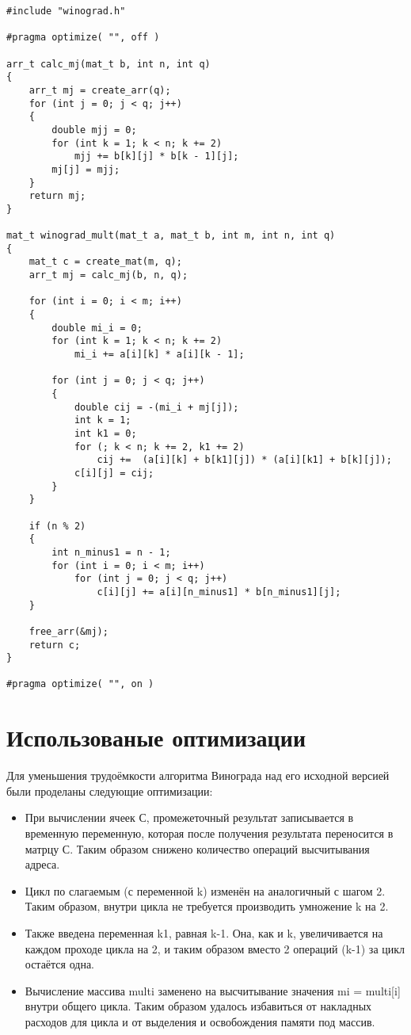 \begin{lstlisting}[caption = Оптимизированая функция умножения матриц алгоритмом Винограда.]
#include "winograd.h"

#pragma optimize( "", off )

arr_t calc_mj(mat_t b, int n, int q)
{
	arr_t mj = create_arr(q);
	for (int j = 0; j < q; j++)
	{
		double mjj = 0; 
		for (int k = 1; k < n; k += 2)
			mjj += b[k][j] * b[k - 1][j];
		mj[j] = mjj;
	}
	return mj;
}

mat_t winograd_mult(mat_t a, mat_t b, int m, int n, int q)
{
	mat_t c = create_mat(m, q);
	arr_t mj = calc_mj(b, n, q);
	
	for (int i = 0; i < m; i++)
	{
		double mi_i = 0;
		for (int k = 1; k < n; k += 2)
			mi_i += a[i][k] * a[i][k - 1];
		
		for (int j = 0; j < q; j++)
		{
			double cij = -(mi_i + mj[j]);
			int k = 1;
			int k1 = 0;
			for (; k < n; k += 2, k1 += 2)
				cij +=	(a[i][k] + b[k1][j]) * (a[i][k1] + b[k][j]);
			c[i][j] = cij;
		}
	}
	
	if (n % 2)
	{
		int n_minus1 = n - 1;
		for (int i = 0; i < m; i++)
			for (int j = 0; j < q; j++)
				c[i][j] += a[i][n_minus1] * b[n_minus1][j];
	}
	
	free_arr(&mj);
	return c;
}

#pragma optimize( "", on )
\end{lstlisting}


\section{Использованые оптимизации}
Для уменьшения трудоёмкости алгоритма Винограда над его исходной версией были проделаны следующие оптимизации:
\begin{itemize}
	\item При вычислении ячеек С, промежеточный результат записывается в временную переменную, которая после получения результата переносится в матрцу С. Таким образом снижено количество операций высчитывания адреса.
	\item Цикл по слагаемым (с переменной k) изменён на аналогичный с шагом 2. Таким образом, внутри цикла не требуется производить умножение k на 2.
	\item Также введена переменная k1, равная k-1. Она, как и k, увеличивается на каждом проходе цикла на 2, и таким образом вместо 2 операций (k-1) за цикл остаётся одна.
	\item Вычисление массива multi заменено на высчитывание значения mi = multi[i] внутри общего цикла. Таким образом удалось избавиться от накладных расходов для цикла и от выделения и освобождения памяти под массив.
\end{itemize}

